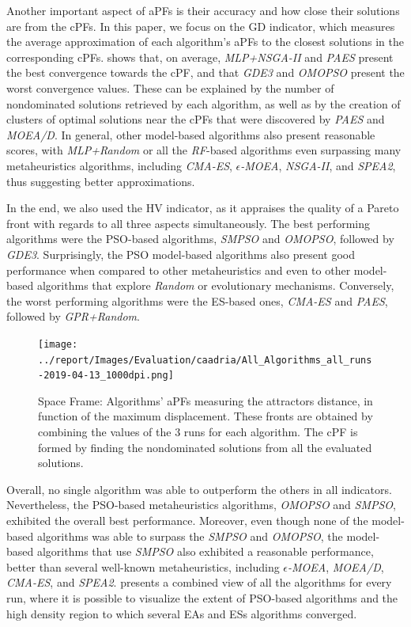 Another important aspect of \acp{aPF} is their accuracy and how close their solutions are from the \acp{cPF}. In this paper, we focus on the \ac{GD} indicator, which measures the average approximation of each algorithm's \acp{aPF} to the closest solutions in the corresponding \acp{cPF}.  shows that, on average, \textit{MLP+NSGA-II} and \textit{PAES} present the best convergence towards the \ac{cPF}, and that \textit{GDE3} and \textit{OMOPSO} present the worst convergence values. These can be explained by the number of nondominated solutions retrieved by each algorithm, as well as by the creation of clusters of optimal solutions near the \acp{cPF} that were discovered by \textit{PAES} and \textit{MOEA/D}. In general, other model-based algorithms also present reasonable scores, with \textit{MLP+Random} or all the \textit{RF}-based algorithms even surpassing many metaheuristics algorithms, including \textit{CMA-ES}, $\epsilon$\textit{-MOEA}, \textit{NSGA-II}, and \textit{SPEA2}, thus suggesting better approximations.

In the end, we also used the \ac{HV} indicator, as it appraises the quality of a Pareto front with regards to all three aspects simultaneously. The best performing algorithms were the \ac{PSO}-based algorithms, \textit{SMPSO} and \textit{OMOPSO}, followed by \textit{GDE3}. Surprisingly, the \ac{PSO} model-based algorithms also present good performance when compared to other metaheuristics and even to other model-based algorithms that explore \textit{Random} or evolutionary mechanisms. Conversely, the worst performing algorithms were the \ac{ES}-based ones, \textit{CMA-ES} and \textit{PAES}, followed by \textit{GPR+Random}. 

\begin{figure}[hptb]
	\centering
	\texttt{[image: ../report/Images/Evaluation/caadria/All\_Algorithms\_all\_runs-2019-04-13\_1000dpi.png]}
	\caption{Space Frame: Algorithms' \acp{aPF} measuring the attractors distance, in function of the maximum displacement. These fronts are obtained by combining the values of the $3$ runs for each algorithm. The \ac{cPF} is formed by finding the nondominated solutions from all the evaluated solutions.}
	\label{fig:allruns}
\end{figure}

Overall, no single algorithm was able to outperform the others in all indicators. Nevertheless, the \ac{PSO}-based metaheuristics algorithms, \textit{OMOPSO} and \textit{SMPSO}, exhibited the overall best performance. Moreover, even though none of the model-based algorithms was able to surpass the \textit{SMPSO} and \textit{OMOPSO}, the model-based algorithms that use \textit{SMPSO} also exhibited a reasonable performance, better than several well-known metaheuristics, including $\epsilon$\textit{-MOEA}, \textit{MOEA/D}, \textit{CMA-ES}, and \textit{SPEA2}.  presents a combined view of all the algorithms for every run, where it is possible to visualize the extent of \ac{PSO}-based algorithms and the high density region to which several \acp{EA} and \acp{ES} algorithms converged.
